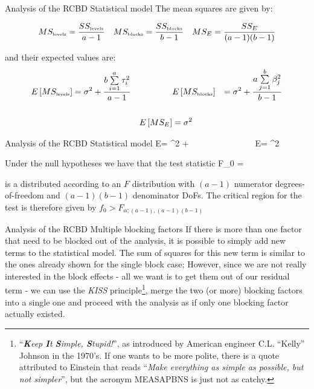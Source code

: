 \documentclass[t]{beamer}
\begin{document}
\begin{ftst}
{Analysis of the RCBD}
{Statistical model}
The mean squares are given by:

\begin{align*}
MS_{\mbox{\tiny levels}} &= \frac{SS_{\mbox{\tiny levels}}}{a-1} &MS_{\mbox{\tiny blocks}} &= \frac{SS_{\mbox{\tiny blocks}}}{b-1}	& MS_{E} &= \frac{SS_{E}}{(a-1)(b-1)}\\
\end{align*}

\noindent and their expected values are:
\begin{align*}
E\left[MS_{\mbox{\tiny levels}}\right] &= \sigma^2 + \frac{b\sum\limits_{i=1}^{a}\tau_i^2}{a-1}	&	&E\left[MS_{\mbox{\tiny blocks}}\right] &= \sigma^2 + \frac{a\sum\limits_{j=1}^{b}\beta_j^2}{b-1}\\&&&&\\ & & E\left[MS_{E}\right] &= \sigma^2 & \ 
\end{align*}
\end{ftst}


\begin{ftst}
{Analysis of the RCBD}
{Statistical model}
\beqs
E = \sigma^2 + 	\ \ \ \ \ \ \ \ \ \ \ \ \ \ \ E\left[MS_{E}\right] = \sigma^2
\eqs

Under the null hypotheses we have that the test statistic
\beqs 
F_0 =  
\eqs

\noindent is a distributed according to an $F$ distribution with $(a-1)$ numerator degrees-of-freedom and $(a-1)(b-1)$ denominator DoFs.
\vone
The critical region for the test is therefore given by
\vone
\centering $f_0 > F_{\alpha; (a-1),\left(a-1\right)\left(b-1\right)}$
\end{ftst}


\begin{ftst}
{Analysis of the RCBD}
{Multiple blocking factors}
If there is more than one factor that need to be blocked out of the analysis, it is possible to simply add new terms to the statistical model. The sum of squares for this new term is similar to the ones already shown for the single block case;
\vone
However, since we are not really interested in the block effects - all we want is to get them out of our residual term - we can use the \textit{KISS} principle\footnote[4]{\tiny``\textit{\textbf{K}eep \textbf{I}t \textbf{S}imple, \textbf{S}tupid!}'', as introduced by American engineer C.L. ``Kelly'' Johnson in the 1970's. If one wants to be more polite, there is a quote attributed to Einstein that reads ``\textit{Make everything as simple as possible, but not simpler}'', but the acronym MEASAPBNS is just not as catchy.}, merge the two (or more) blocking factors into a single one and proceed with the analysis as if only one blocking factor actually existed.
\end{ftst}
\end{document}

